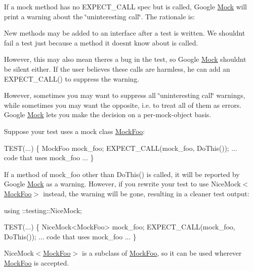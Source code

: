 If a mock method has no {\ttfamily E\+X\+P\+E\+C\+T\+\_\+\+C\+A\+LL} spec but is called, Google \hyperlink{class_mock}{Mock} will print a warning about the \char`\"{}uninteresting call\char`\"{}. The rationale is\+:


\begin{DoxyItemize}
\item New methods may be added to an interface after a test is written. We shouldn\textquotesingle{}t fail a test just because a method it doesn\textquotesingle{}t know about is called.
\item However, this may also mean there\textquotesingle{}s a bug in the test, so Google \hyperlink{class_mock}{Mock} shouldn\textquotesingle{}t be silent either. If the user believes these calls are harmless, he can add an {\ttfamily E\+X\+P\+E\+C\+T\+\_\+\+C\+A\+L\+L()} to suppress the warning.
\end{DoxyItemize}

However, sometimes you may want to suppress all \char`\"{}uninteresting call\char`\"{} warnings, while sometimes you may want the opposite, i.\+e. to treat all of them as errors. Google \hyperlink{class_mock}{Mock} lets you make the decision on a per-\/mock-\/object basis.

Suppose your test uses a mock class {\ttfamily \hyperlink{class_mock_foo}{Mock\+Foo}}\+:


\begin{DoxyCode}
TEST(...) \{
  MockFoo mock\_foo;
  EXPECT\_CALL(mock\_foo, DoThis());
  ... code that uses mock\_foo ...
\}
\end{DoxyCode}


If a method of {\ttfamily mock\+\_\+foo} other than {\ttfamily Do\+This()} is called, it will be reported by Google \hyperlink{class_mock}{Mock} as a warning. However, if you rewrite your test to use {\ttfamily Nice\+Mock$<$\hyperlink{class_mock_foo}{Mock\+Foo}$>$} instead, the warning will be gone, resulting in a cleaner test output\+:


\begin{DoxyCode}
using ::testing::NiceMock;

TEST(...) \{
  NiceMock<MockFoo> mock\_foo;
  EXPECT\_CALL(mock\_foo, DoThis());
  ... code that uses mock\_foo ...
\}
\end{DoxyCode}


{\ttfamily Nice\+Mock$<$\hyperlink{class_mock_foo}{Mock\+Foo}$>$} is a subclass of {\ttfamily \hyperlink{class_mock_foo}{Mock\+Foo}}, so it can be used wherever {\ttfamily \hyperlink{class_mock_foo}{Mock\+Foo}} is accepted.

